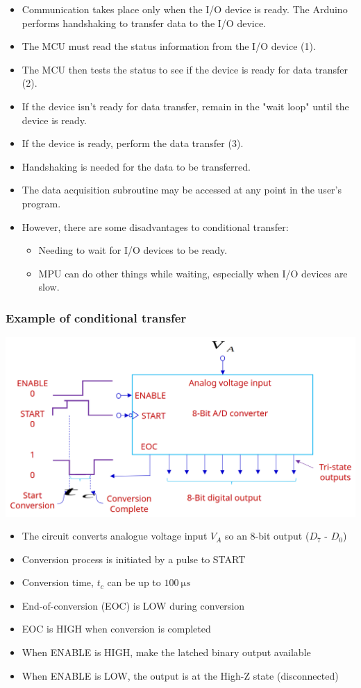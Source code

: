 \documentclass[11pt]{article}
\begin{document}
\begin{itemize}
\item Communication takes place only when the I/O device is ready. The Arduino performs handshaking to transfer data to the I/O device.
\item The MCU must read the status information from the I/O device (1).
\item The MCU then tests the status to see if the device is ready for data transfer (2).
\item If the device isn't ready for data transfer, remain in the "wait loop" until the device is ready.
\item If the device is ready, perform the data transfer (3).
\item Handshaking is needed for the data to be transferred.
\item The data acquisition subroutine may be accessed at any point in the user's program.
\item However, there are some disadvantages to conditional transfer:
\begin{itemize}
\item Needing to wait for I/O devices to be ready.
\item MPU can do other things while waiting, especially when I/O devices are slow.
\end{itemize}
\end{itemize}

\subsubsection{Example of conditional transfer}
\label{sec:orgb7d46c7}
\begin{center}
\includegraphics[width=.9\linewidth]{./images/conditional-transfer-example.png}
\end{center}
\begin{itemize}
\item The circuit converts analogue voltage input \(V_A\) so an 8-bit output (\(D_7\) - \(D_0\))
\item Conversion process is initiated by a pulse to START
\item Conversion time, \(t_c\) can be up to \(\qty{100}{\micro s}\)
\item End-of-conversion (EOC) is LOW during conversion
\item EOC is HIGH when conversion is completed
\item When ENABLE is HIGH, make the latched binary output available
\item When ENABLE is LOW, the output is at the High-Z state (disconnected)
\end{itemize}
\end{document}
